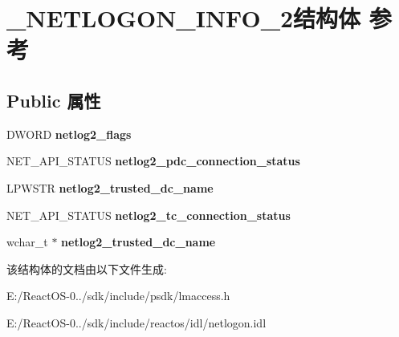 \hypertarget{struct___n_e_t_l_o_g_o_n___i_n_f_o__2}{}\section{\+\_\+\+N\+E\+T\+L\+O\+G\+O\+N\+\_\+\+I\+N\+F\+O\+\_\+2结构体 参考}
\label{struct___n_e_t_l_o_g_o_n___i_n_f_o__2}
\subsection*{Public 属性}
\begin{DoxyCompactItemize}
\item 
\mbox{\label{struct___n_e_t_l_o_g_o_n___i_n_f_o__2_a60d45b92b90ccbb038a40a70f3ef9386}} 
D\+W\+O\+RD {\bfseries netlog2\+\_\+flags}
\item 
\mbox{\label{struct___n_e_t_l_o_g_o_n___i_n_f_o__2_ab05a7cdcf20068095a633852514252a8}} 
N\+E\+T\+\_\+\+A\+P\+I\+\_\+\+S\+T\+A\+T\+US {\bfseries netlog2\+\_\+pdc\+\_\+connection\+\_\+status}
\item 
\mbox{\label{struct___n_e_t_l_o_g_o_n___i_n_f_o__2_a4d838fab7cad26430d17d2b5e0cae9d0}} 
L\+P\+W\+S\+TR {\bfseries netlog2\+\_\+trusted\+\_\+dc\+\_\+name}
\item 
\mbox{\label{struct___n_e_t_l_o_g_o_n___i_n_f_o__2_a1da7afc537034a36e9b4a33fc151a49b}} 
N\+E\+T\+\_\+\+A\+P\+I\+\_\+\+S\+T\+A\+T\+US {\bfseries netlog2\+\_\+tc\+\_\+connection\+\_\+status}
\item 
\mbox{\label{struct___n_e_t_l_o_g_o_n___i_n_f_o__2_ab6eb1e733dde05cae092360b55ef2a8e}} 
wchar\+\_\+t $\ast$ {\bfseries netlog2\+\_\+trusted\+\_\+dc\+\_\+name}
\end{DoxyCompactItemize}


该结构体的文档由以下文件生成\+:\begin{DoxyCompactItemize}
\item 
E\+:/\+React\+O\+S-\/0../sdk/include/psdk/lmaccess.\+h\item 
E\+:/\+React\+O\+S-\/0../sdk/include/reactos/idl/netlogon.\+idl\end{DoxyCompactItemize}
